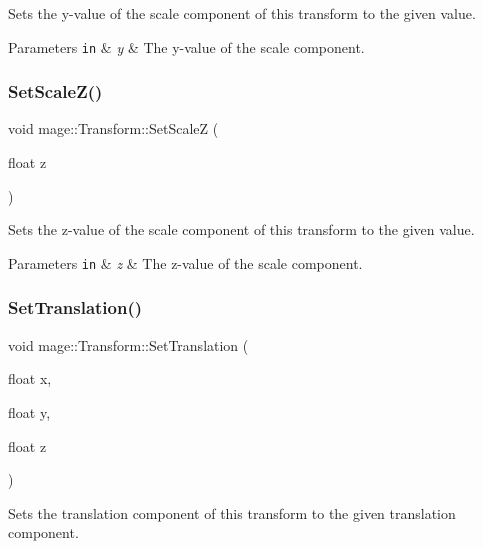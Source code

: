 Sets the y-\/value of the scale component of this transform to the given value.


\begin{DoxyParams}[1]{Parameters}
\mbox{\tt in}  & {\em y} & The y-\/value of the scale component. \\
\hline
\end{DoxyParams}
\hypertarget{structmage_1_1_transform_af8cd0167f776708697041544886ff2de}{}\label{structmage_1_1_transform_af8cd0167f776708697041544886ff2de} 
\subsubsection{\texorpdfstring{Set\+Scale\+Z()}{SetScaleZ()}}
{\footnotesize\ttfamily void mage\+::\+Transform\+::\+Set\+ScaleZ (\begin{DoxyParamCaption}\item[{float}]{z }\end{DoxyParamCaption})}

Sets the z-\/value of the scale component of this transform to the given value.


\begin{DoxyParams}[1]{Parameters}
\mbox{\tt in}  & {\em z} & The z-\/value of the scale component. \\
\hline
\end{DoxyParams}
\hypertarget{structmage_1_1_transform_acf702bb57431be2986ca487e07189bda}{}\label{structmage_1_1_transform_acf702bb57431be2986ca487e07189bda} 
\subsubsection{\texorpdfstring{Set\+Translation()}{SetTranslation()}\hspace{0.1cm}{\footnotesize\ttfamily [1/2]}}
{\footnotesize\ttfamily void mage\+::\+Transform\+::\+Set\+Translation (\begin{DoxyParamCaption}\item[{float}]{x,  }\item[{float}]{y,  }\item[{float}]{z }\end{DoxyParamCaption})}

Sets the translation component of this transform to the given translation component.


